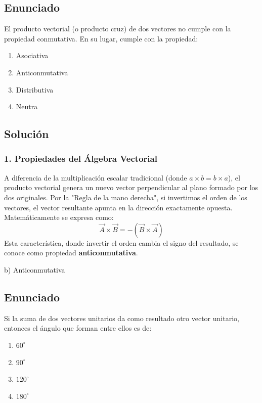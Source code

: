 \documentclass[12pt, a4paper]{article}
\begin{document}
\newpage


\subsection*{Enunciado}
El producto vectorial (o producto cruz) de dos vectores no cumple con la propiedad conmutativa. En su lugar, cumple con la propiedad:
\begin{enumerate}[label=\alph*)]
    \item Asociativa
    \item Anticonmutativa
    \item Distributiva
    \item Neutra
\end{enumerate}

\subsection*{Solución}

\subsubsection*{1. Propiedades del Álgebra Vectorial}
A diferencia de la multiplicación escalar tradicional (donde $a \times b = b \times a$), el producto vectorial genera un nuevo vector perpendicular al plano formado por los dos originales. 
Por la "Regla de la mano derecha", si invertimos el orden de los vectores, el vector resultante apunta en la dirección exactamente opuesta. Matemáticamente se expresa como:
$$ \vec{A} \times \vec{B} = - (\vec{B} \times \vec{A}) $$
Esta característica, donde invertir el orden cambia el signo del resultado, se conoce como propiedad \textbf{anticonmutativa}.

\begin{tcolorbox}[colback=green!5!white, colframe=green!50!black, title=Respuesta Final]
\centering \Large b) Anticonmutativa
\end{tcolorbox}

\newpage


\subsection*{Enunciado}
Si la suma de dos vectores unitarios da como resultado otro vector unitario, entonces el ángulo que forman entre ellos es de:
\begin{enumerate}[label=\alph*)]
    \item $60^\circ$
    \item $90^\circ$
    \item $120^\circ$
    \item $180^\circ$
\end{enumerate}
\end{document}
